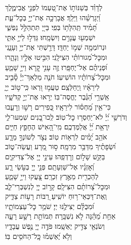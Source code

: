\documentclass[twoside, openany, parskip=half, 11pt]{book}
\begin{document}
\begin{narrow}
לְדָוִ֗ד \hfill 
בְּשַׁנּוֹת֣וֹ אֶת־טַ֭עְמוֹ לִפְנֵ֣י אֲבִימֶ֑לֶךְ\\ וַ֝יְגָרְשֵׁ֗הוּ וַיֵּלַֽךְ׃ \hfill
 אֲבָרְכָ֣ה אֶת־יְיָ֣ בְּכׇל־עֵ֑ת \\ תָּ֝מִ֗יד תְּֽהִלָּת֥וֹ בְּפִֽי׃ \hfill
 בַּייָ֭ תִּתְהַלֵּ֣ל נַפְשִׁ֑י\\ יִשְׁמְע֖וּ עֲנָוִ֣ים וְיִשְׂמָֽחוּ׃ \hfill
 גַּדְּל֣וּ לַייָ֣ אִתִּ֑י\\ וּנְרוֹמְמָ֖ה שְׁמ֣וֹ יַחְדָּֽו׃ \hfill
 דָּרַ֣שְׁתִּי אֶת־יְיָ֣ וְעָנָ֑נִי\\ וּמִכׇּל־מְ֝גוּרוֹתַ֗י הִצִּילָֽנִי׃ \hfill
 הִבִּ֣יטוּ אֵלָ֣יו וְנָהָ֑רוּ\\ וּ֝פְנֵיהֶ֗ם אַל־יֶחְפָּֽרוּ׃ \hfill
 זֶ֤ה עָנִ֣י קָ֭רָא וַייָ֣ שָׁמֵ֑עַ\\ וּמִכׇּל־צָ֝רוֹתָ֗יו הוֹשִׁיעֽוֹ׃ \hfill
 חֹנֶ֤ה מַלְאַךְ־יְיָ֓ סָ֘בִ֤יב\\ לִירֵאָ֗יו וַֽיְחַלְּצֵֽם׃ \hfill
  טַעֲמ֣וּ וּ֭רְאוּ כִּֽי־ט֣וֹב יְיָ֑\\ אַֽשְׁרֵ֥י הַ֝גֶּ֗בֶר יֶחֱסֶה־בּֽוֹ׃ \hfill
 יְר֣אוּ אֶת־יְיָ֣ קְדֹשָׁ֑יו\\ כִּי־אֵ֥ין מַ֝חְס֗וֹר לִירֵאָֽיו׃ \hfill
 כְּ֭פִירִים רָשׁ֣וּ וְרָעֵ֑בוּ\\ וְדֹרְשֵׁ֥י יְ֝יָ֗ לֹא־יַחְסְר֥וּ כׇל־טֽוֹב׃ \hfill
 לְֽכוּ־בָ֭נִים שִׁמְעוּ־לִ֑י\\ יִֽרְאַ֥ת יְ֝יָ֗ אֲלַמֶּדְכֶֽם׃ \hfill
 מִֽי־הָ֭אִישׁ הֶחָפֵ֣ץ חַיִּ֑ים\\ אֹהֵ֥ב יָ֝מִ֗ים לִרְא֥וֹת טֽוֹב׃ \hfill
 נְצֹ֣ר לְשׁוֹנְךָ֣ מֵרָ֑ע\\ וּ֝שְׂפָתֶ֗יךָ מִדַּבֵּ֥ר מִרְמָֽה׃ \hfill
 ס֣וּר מֵ֭רָע וַעֲשֵׂה־ט֑וֹב\\ בַּקֵּ֖שׁ שָׁל֣וֹם וְרׇדְפֵֽהוּ׃ \hfill
 עֵינֵ֣י יְיָ֭ אֶל־צַדִּיקִ֑ים\\ וְ֝אׇזְנָ֗יו אֶל־שַׁוְעָתָֽם׃ \hfill
 פְּנֵ֣י יְיָ֭ בְּעֹ֣שֵׂי רָ֑ע\\ לְהַכְרִ֖ית מֵאֶ֣רֶץ זִכְרָֽם׃ \hfill
 צָ֭עֲקוּ וַייָ֣ שָׁמֵ֑עַ\\ וּמִכׇּל־צָ֝רוֹתָ֗ם הִצִּילָֽם׃ \hfill
 קָר֣וֹב יְיָ֭ לְנִשְׁבְּרֵי־לֵ֑ב\\ וְֽאֶת־דַּכְּאֵי־ר֥וּחַ יוֹשִֽׁיעַ׃ \hfill
 רַ֭בּוֹת רָע֣וֹת צַדִּ֑יק\\ וּ֝מִכֻּלָּ֗ם יַצִּילֶ֥נּוּ יְיָ׃ \hfill
 שֹׁמֵ֥ר כׇּל־עַצְמוֹתָ֑יו\\ אַחַ֥ת מֵ֝הֵ֗נָּה לֹ֣א נִשְׁבָּֽרָה׃ \hfill
 תְּמוֹתֵ֣ת רָשָׁ֣ע רָעָ֑ה\\ וְשֹׂנְאֵ֖י צַדִּ֣יק יֶאְשָֽׁמוּ׃ \hfill
 פֹּדֶ֣ה יְיָ֭ נֶ֣פֶשׁ עֲבָדָ֑יו\\ וְלֹ֥א יֶ֝אְשְׁמ֗וּ \hfill כׇּֽל־הַחֹסִ֥ים בּֽוֹ׃ \\




\end{narrow}
\end{document}
